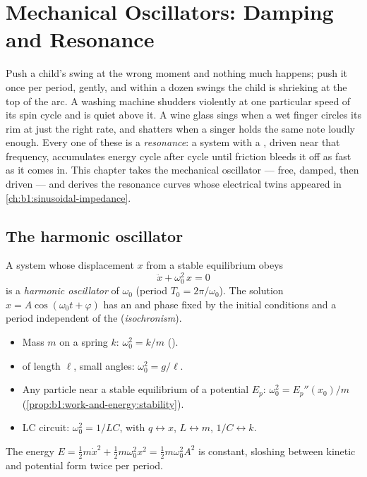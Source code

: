\chapter{Mechanical Oscillators: Damping and Resonance}\label{ch:b1:oscillators-resonance}

Push a child's swing at the wrong moment and nothing much happens; push
it once per period, gently, and within a dozen swings the child is
shrieking at the top of the arc. A washing machine shudders violently
at one particular speed of its spin cycle and is quiet above it. A
wine glass sings when a wet finger circles its rim at just the right
rate, and shatters when a singer holds the same note loudly enough.
Every one of these is a \emph{resonance}: a system with a , driven near that frequency, accumulates energy cycle after
cycle until friction bleeds it off as fast as it comes in. This
chapter takes the mechanical oscillator --- free, damped, then driven
--- and derives the resonance curves whose electrical twins appeared
in \cref{ch:b1:sinusoidal-impedance}.

\section{The harmonic oscillator}

\begin{definition}\label{def:b1:oscillators-resonance:harmonic}
A system whose displacement $x$ from a stable equilibrium obeys
\[
\ddot x + \omega_0^2\,x = 0
\]
is a \emph{harmonic oscillator} of \emph{}
$\omega_0$ (period $T_0 = 2\pi/\omega_0$). The solution $x = A\cos(\omega_0t
+ \varphi)$ has an  and phase fixed by the initial conditions
and a period independent of the  (\emph{isochronism}).
\end{definition}

\begin{proposition}\label{prop:b1:oscillators-resonance:sources}
\begin{itemize}
  \item Mass $m$ on a spring $k$: $\omega_0^2 = k/m$ ().
  \item {} of length $\ell$, small angles: $\omega_0^2 = g/\ell$.
  \item Any particle near a stable equilibrium of a potential $E_p$:
        $\omega_0^2 = E_p''(x_0)/m$ (\cref{prop:b1:work-and-energy:stability}).
  \item LC circuit: $\omega_0^2 = 1/LC$, with $q \leftrightarrow x$,
        $L \leftrightarrow m$, $1/C \leftrightarrow k$.
\end{itemize}
The energy $E = \tfrac12 m\dot x^2 + \tfrac12 m\omega_0^2x^2 = \tfrac12
m\omega_0^2A^2$ is constant, sloshing between kinetic and potential
form twice per period.
\end{proposition}

